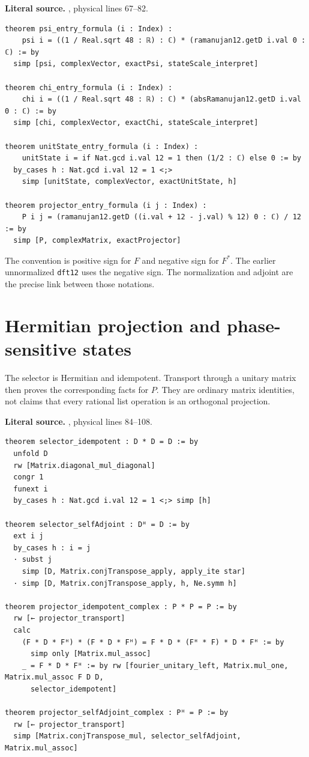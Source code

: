 \noindent\textbf{Literal source.} \texttt{}, physical lines 67--82.

\begin{Verbatim}[breaklines=true,breakanywhere=true,fontsize=\footnotesize,samepage=true]
theorem psi_entry_formula (i : Index) :
    psi i = ((1 / Real.sqrt 48 : ℝ) : ℂ) * (ramanujan12.getD i.val 0 : ℂ) := by
  simp [psi, complexVector, exactPsi, stateScale_interpret]

theorem chi_entry_formula (i : Index) :
    chi i = ((1 / Real.sqrt 48 : ℝ) : ℂ) * (absRamanujan12.getD i.val 0 : ℂ) := by
  simp [chi, complexVector, exactChi, stateScale_interpret]

theorem unitState_entry_formula (i : Index) :
    unitState i = if Nat.gcd i.val 12 = 1 then (1/2 : ℂ) else 0 := by
  by_cases h : Nat.gcd i.val 12 = 1 <;>
    simp [unitState, complexVector, exactUnitState, h]

theorem projector_entry_formula (i j : Index) :
    P i j = (ramanujan12.getD ((i.val + 12 - j.val) % 12) 0 : ℂ) / 12 := by
  simp [P, complexMatrix, exactProjector]
\end{Verbatim}

The convention is positive sign for \(F\) and negative sign for \(F^*\). The
earlier unnormalized \texttt{dft12} uses the negative sign. The normalization
and adjoint are the precise link between those notations.

\section{Hermitian projection and phase-sensitive states}
The selector is Hermitian and idempotent. Transport through a unitary matrix
then proves the corresponding facts for \(P\). They are ordinary matrix
identities, not claims that every rational list operation is an orthogonal
projection.

\noindent\textbf{Literal source.} \texttt{}, physical lines 84--108.

\begin{Verbatim}[breaklines=true,breakanywhere=true,fontsize=\footnotesize]
theorem selector_idempotent : D * D = D := by
  unfold D
  rw [Matrix.diagonal_mul_diagonal]
  congr 1
  funext i
  by_cases h : Nat.gcd i.val 12 = 1 <;> simp [h]

theorem selector_selfAdjoint : Dᴴ = D := by
  ext i j
  by_cases h : i = j
  · subst j
    simp [D, Matrix.conjTranspose_apply, apply_ite star]
  · simp [D, Matrix.conjTranspose_apply, h, Ne.symm h]

theorem projector_idempotent_complex : P * P = P := by
  rw [← projector_transport]
  calc
    (F * D * Fᴴ) * (F * D * Fᴴ) = F * D * (Fᴴ * F) * D * Fᴴ := by
      simp only [Matrix.mul_assoc]
    _ = F * D * Fᴴ := by rw [fourier_unitary_left, Matrix.mul_one, Matrix.mul_assoc F D D,
      selector_idempotent]

theorem projector_selfAdjoint_complex : Pᴴ = P := by
  rw [← projector_transport]
  simp [Matrix.conjTranspose_mul, selector_selfAdjoint, Matrix.mul_assoc]
\end{Verbatim}


